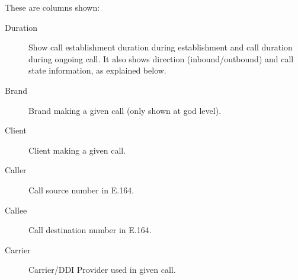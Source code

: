 \documentclass[letterpaper,10pt,spanish]{sphinxmanual}
\begin{document}
These are columns shown:
\begin{description}
\item[{Duration}] \leavevmode{}\label{administration_portal/platform/active_calls:term-duration}
Show call establishment duration during establishment and call duration during ongoing call. It also shows
direction (inbound/outbound) and call state information, as explained below.

\item[{Brand}] \leavevmode{}\label{administration_portal/platform/active_calls:term-brand}
Brand making a given call (only shown at god level).

\item[{Client}] \leavevmode{}\label{administration_portal/platform/active_calls:term-client}
Client making a given call.

\item[{Caller}] \leavevmode{}\label{administration_portal/platform/active_calls:term-caller}
Call source number in E.164.

\item[{Callee}] \leavevmode{}\label{administration_portal/platform/active_calls:term-callee}
Call destination number in E.164.

\item[{Carrier}] \leavevmode{}\label{administration_portal/platform/active_calls:term-carrier}
Carrier/DDI Provider used in given call.

\end{description}
\end{document}

